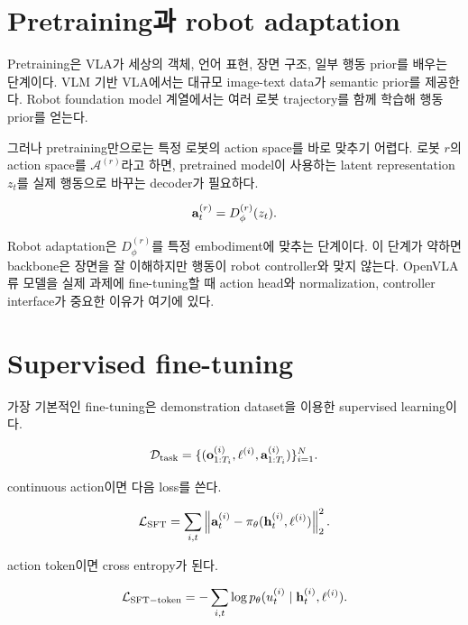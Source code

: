\section{Pretraining과 robot adaptation}

Pretraining은 VLA가 세상의 객체, 언어 표현, 장면 구조, 일부 행동 prior를 배우는 단계이다. VLM 기반 VLA에서는 대규모 image-text data가 semantic prior를 제공한다. Robot foundation model 계열에서는 여러 로봇 trajectory를 함께 학습해 행동 prior를 얻는다.

그러나 pretraining만으로는 특정 로봇의 action space를 바로 맞추기 어렵다. 로봇 $r$의 action space를 $\mathcal{A}^{(r)}$라고 하면, pretrained model이 사용하는 latent representation $z_t$를 실제 행동으로 바꾸는 decoder가 필요하다.

\begin{equation}
  \mathbf{a}_t^{(r)}
  =
  D_{\phi}^{(r)}(z_t).
\end{equation}

Robot adaptation은 $D_{\phi}^{(r)}$를 특정 embodiment에 맞추는 단계이다. 이 단계가 약하면 backbone은 장면을 잘 이해하지만 행동이 robot controller와 맞지 않는다. OpenVLA류 모델을 실제 과제에 fine-tuning할 때 action head와 normalization, controller interface가 중요한 이유가 여기에 있다.

\section{Supervised fine-tuning}

가장 기본적인 fine-tuning은 demonstration dataset을 이용한 supervised learning이다.

\begin{equation}
  \mathcal{D}_{\mathrm{task}}
  =
  \{(\mathbf{o}_{1:T_i}^{(i)}, \ell^{(i)}, \mathbf{a}_{1:T_i}^{(i)})\}_{i=1}^{N}.
\end{equation}

continuous action이면 다음 loss를 쓴다.

\begin{equation}
  \mathcal{L}_{\mathrm{SFT}}
  =
  \sum_{i,t}
  \left\|
  \mathbf{a}_t^{(i)}
  -
  \pi_\theta(\mathbf{h}_t^{(i)},\ell^{(i)})
  \right\|_2^2.
\end{equation}

action token이면 cross entropy가 된다.

\begin{equation}
  \mathcal{L}_{\mathrm{SFT-token}}
  =
  -
  \sum_{i,t}
  \log
  p_\theta(u_t^{(i)} \mid \mathbf{h}_t^{(i)},\ell^{(i)}).
\end{equation}

